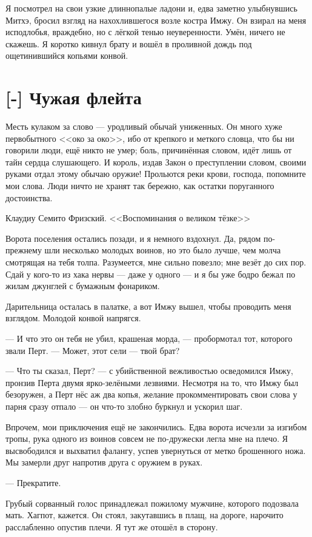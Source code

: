 Я посмотрел на свои узкие длиннопалые ладони и, едва заметно улыбнувшись Митхэ, бросил взгляд на нахохлившегося возле костра Имжу.
Он взирал на меня исподлобья, враждебно, но с лёгкой тенью неуверенности.
Умён, ничего не скажешь.
Я коротко кивнул брату и вошёл в проливной дождь под ощетинившийся копьями конвой.

\section{[-] Чужая флейта}

\epigraph
{Месть кулаком за слово --- уродливый обычай униженных.
Он много хуже первобытного <<око за око>>, ибо от крепкого и меткого словца, что бы ни говорили люди, ещё никто не умер;
боль, причинённая словом, идёт лишь от тайн сердца слушающего.
И король, издав Закон о преступлении словом, своими руками отдал этому обычаю оружие!
Прольются реки крови, господа, попомните мои слова.
Люди ничто не хранят так бережно, как остатки поруганного достоинства.}
{Клаудиу Семито Фризский.
<<Воспоминания о великом тёзке>>}

Ворота поселения остались позади, и я немного вздохнул.
Да, рядом по-прежнему шли несколько молодых воинов, но это было лучше, чем молча смотрящая на тебя толпа.
Разумеется, мне сильно повезло;
мне везёт до сих пор.
Сдай у кого-то из хака нервы --- даже у одного --- и я бы уже бодро бежал по жилам джунглей с бумажным фонариком.

Дарительница осталась в палатке, а вот Имжу вышел, чтобы проводить меня взглядом.
Молодой конвой напрягся.

--- И что это он тебя не убил, крашеная морда, --- пробормотал тот, которого звали Перт.
--- Может, этот сели --- твой брат?

--- Что ты сказал, Перт? --- с убийственной вежливостью осведомился Имжу, пронзив Перта двумя ярко-зелёными лезвиями.
Несмотря на то, что Имжу был безоружен, а Перт нёс аж два копья, желание прокомментировать свои слова у парня сразу отпало --- он что-то злобно буркнул и ускорил шаг.

Впрочем, мои приключения ещё не закончились.
Едва ворота исчезли за изгибом тропы, рука одного из воинов совсем не по-дружески легла мне на плечо.
Я высвободился и выхватил фалангу, успев увернуться от метко брошенного ножа.
Мы замерли друг напротив друга с оружием в руках.

--- Прекратите.

Грубый сорванный голос принадлежал пожилому мужчине, которого подозвала мать.
Хагпот, кажется.
Он стоял, закутавшись в плащ, на дороге, нарочито расслабленно опустив плечи.
Я тут же отошёл в сторону.

